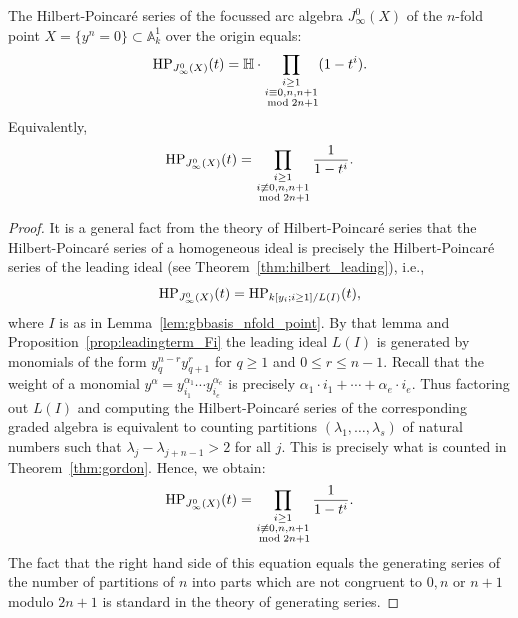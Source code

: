 \begin{Thm}\label{thm:hp_nfold_point}
  The Hilbert-Poincar\'{e} series of the focussed arc algebra $J_\infty^0(X)$ of
  the $n$-fold point $X = \{y^n=0\} \subset \mathbb{A}_k^1$ over the origin equals: 
  $$\operatorname{HP}_{J_\infty^0(X)}(t)=\mathbb{H}\cdot
  \prod_{\substack{i\geq 1\\ i \equiv 0, n,n+1 \\ \bmod 2n+1}} (1-t^i).$$
  Equivalently, $$\operatorname{HP}_{J_\infty^0(X)}(t)=\prod_{\substack{i\geq 1\\ i\not\equiv 0,n,n+1\\ \bmod 2n+1}} \frac{1}{1-t^i}
  .$$
\end{Thm}

\begin{proof}
  It is a general fact from the theory of Hilbert-Poincar\'{e} series that the Hilbert-Poincar\'{e} series
  of a homogeneous ideal is precisely the Hilbert-Poincar\'{e} series of the leading
  ideal (see Theorem~\ref{thm:hilbert_leading}), i.e.,
  $$\operatorname{HP}_{J_\infty^0(X)}(t)= \operatorname{HP}_{k[y_i;i\geq 1]/L(I)}(t),$$
  where $I$ is as in Lemma~\ref{lem:gbbasis_nfold_point}. By that lemma and Proposition~\ref{prop:leadingterm_Fi} the leading ideal $L(I)$ is generated by monomials of the form $y_{q}^{n-r}y_{q+1}^r$ for $q\geq 1$ and $0\leq r \leq n-1$. Recall
  that the weight of a monomial $y^\alpha=y_{i_1}^{\alpha_1}\cdots
  y_{i_e}^{\alpha_e}$ is precisely $\alpha_1\cdot i_1+ \cdots +
  \alpha_e\cdot i_e$. Thus factoring out $L(I)$ and computing the
  Hilbert-Poincar\'{e} series of the corresponding graded algebra is equivalent to
  counting partitions $(\lambda_1,\ldots,\lambda_s)$ of natural numbers such that $ \lambda_j - \lambda_{j+n-1} > 2$ for all $j$. This is precisely what is counted in Theorem~\ref{thm:gordon}. Hence, we obtain:
  $$\operatorname{HP}_{J_\infty^0(X)}(t)=\prod_{\substack{i\geq 1\\ i\not\equiv 0,n,n+1\\ \bmod 2n+1}} \frac{1}{1-t^i}.$$
  The fact that the right hand side of this equation equals the
  generating series of the number of partitions of $n$ into parts
  which are not congruent to $0,n$ or $n+1$ modulo $2n+1$ is standard in the theory
  of generating series. 
\end{proof}

